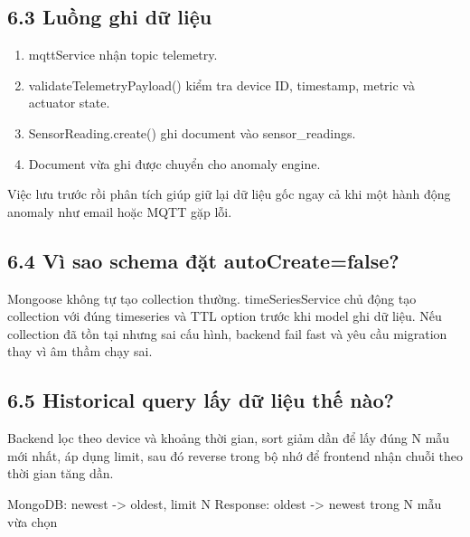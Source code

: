 \documentclass[11pt,oneside,openany]{book}
\renewcommand{\texttt}[1]{{\ttfamily\small #1}}
\newenvironment{Shaded}{\begin{snugshade}}{\end{snugshade}}
\newcommand{\NormalTok}[1]{\textcolor[rgb]{0.81,0.81,0.76}{#1}}
\renewenvironment{Shaded}{%
  \def\FrameCommand{\fboxsep=8pt\colorbox{shadecolor}}%
  \MakeFramed{\advance\hsize-\width\FrameRestore}%
}{\endMakeFramed}
\providecommand{\tightlist}{\setlength{\itemsep}{1pt}\setlength{\parskip}{0pt}}
\begin{document}
\subsection{6.3 Luồng ghi dữ
liệu}\label{63-luux1ed3ng-ghi-dux1eef-liux1ec7u}

\begin{enumerate}
\def\labelenumi{\arabic{enumi}.}
\tightlist
\item
  \texttt{mqttService} nhận topic telemetry.
\item
  \texttt{validateTelemetryPayload()} kiểm tra device ID, timestamp,
  metric và actuator state.
\item
  \texttt{SensorReading.create()} ghi document vào
  \texttt{sensor\_readings}.
\item
  Document vừa ghi được chuyển cho anomaly engine.
\end{enumerate}

Việc lưu trước rồi phân tích giúp giữ lại dữ liệu gốc ngay cả khi một
hành động anomaly như email hoặc MQTT gặp lỗi.

\subsection{\texorpdfstring{6.4 Vì sao schema đặt
\texttt{autoCreate=false}?}{6.4 Vì sao schema đặt autoCreate=false?}}\label{64-vuxec-sao-schema-ux111ux1eb7t-autocreatefalse}

Mongoose không tự tạo collection thường. \texttt{timeSeriesService} chủ
động tạo collection với đúng \texttt{timeseries} và TTL option trước khi
model ghi dữ liệu. Nếu collection đã tồn tại nhưng sai cấu hình, backend
fail fast và yêu cầu migration thay vì âm thầm chạy sai.

\subsection{6.5 Historical query lấy dữ liệu thế
nào?}\label{65-historical-query-lux1ea5y-dux1eef-liux1ec7u-thux1ebf-nuxe0o}

Backend lọc theo device và khoảng thời gian, sort giảm dần để lấy đúng N
mẫu mới nhất, áp dụng limit, sau đó reverse trong bộ nhớ để frontend
nhận chuỗi theo thời gian tăng dần.

\begin{Shaded}
\begin{Highlighting}[]
\NormalTok{MongoDB: newest {-}\textgreater{} oldest, limit N}
\NormalTok{Response: oldest {-}\textgreater{} newest trong N mẫu vừa chọn}
\end{Highlighting}
\end{Shaded}
\end{document}

